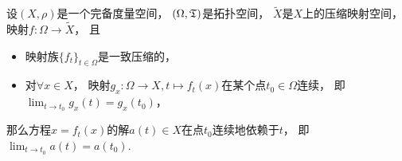\begin{proposition}[关于不动点的稳定性]
设\((X,\rho)\)是一个完备度量空间，
\((\Omega,{\mathfrak T})\)是拓扑空间，
\(\tilde{X}\)是\(X\)上的压缩映射空间，
映射\(f\colon \Omega \to \tilde{X}\)，
且\begin{itemize}
	\item 映射族\(\{f_t\}_{t\in\Omega}\)是一致压缩的，
	\item 对\(\forall x \in X\)，
	映射\(g_x\colon \Omega \to X, t \mapsto f_t(x)\)在某个点\(t_0 \in \Omega\)连续，
	即\(\lim_{t \to t_0} g_x(t) = g_x(t_0)\)，
\end{itemize}
那么方程\(x = f_t(x)\)的解\(a(t) \in X\)在点\(t_0\)连续地依赖于\(t\)，
即\(\lim_{t \to t_0} a(t) = a(t_0)\).
\end{proposition}
